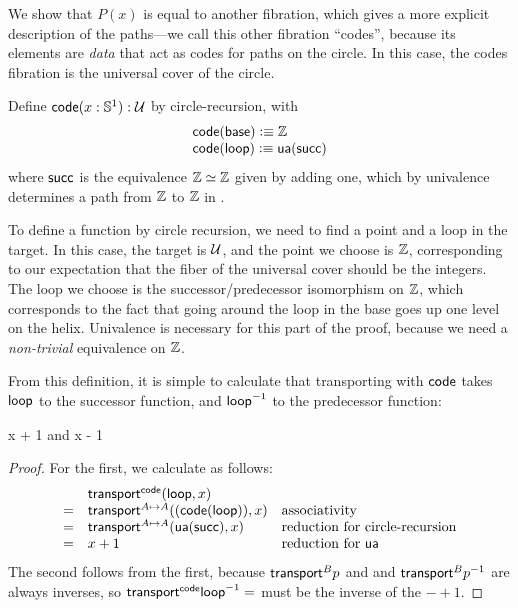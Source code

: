 We show that $P(x)$ is equal to another fibration, which gives a more
explicit description of the paths---we call this other fibration
``codes'', because its elements are \emph{data} that act as codes for
paths on the circle.  In this case, the codes fibration is the universal
cover of the circle.

\begin{defn}
Define $\mathsf{code}(x:\mathbb{S} ^1) : \mathcal{U}$ by circle-recursion, with 
\[
\begin{array}{l}
\mathsf{code}(\mathsf{base}) \vcentcolon\equiv \mathbb{Z} \\
{\mathsf{code}}({\mathsf{loop}}) \vcentcolon\equiv \mathsf{ua}(\mathsf{succ}) \\
\end{array}
\]
where $\mathsf{succ}$ is the equivalence $\mathbb{Z} \simeq \mathbb{Z}$ given by
adding one, which by univalence determines a path from $\mathbb{Z}$ to
$\mathbb{Z}$ in \type.  
\end{defn}

To define a function by circle recursion, we need to find a point and a
loop in the target.  In this case, the target is $\mathcal{U}$, and the point
we choose is $\mathbb{Z}$, corresponding to our expectation that the
fiber of the universal cover should be the integers.  The loop we choose
is the successor/predecessor isomorphism on $\mathbb{Z}$, which
corresponds to the fact that going around the loop in the base goes up
one level on the helix.  Univalence is necessary for this part of the
proof, because we need a \emph{non-trivial} equivalence on $\mathbb{Z}$.  

From this definition, it is simple to calculate that transporting with
$\mathsf{code}$ takes $\mathsf{loop}$ to the successor function, and 
$\mathord{{\mathsf{loop}}^{-1}}$ to the predecessor function:
\begin{lem} \label{lem:transport-s1-code}
 {x + 1} and 
 {x - 1}
\end{lem}
\begin{proof}
For the first, we calculate as follows:
\[
\begin{array}{lll}
 & {\mathsf{transport}^{\mathsf{code}}(\mathsf{loop},x)} &\\
= & \mathsf{transport}^{A \mapsto A}(({\mathsf{code}}({\mathsf{loop}})),x) & \text{associativity}\\
= & \mathsf{transport}^{A \mapsto A}(\mathsf{ua} (\mathsf{succ}),x) & \text{reduction for circle-recursion}\\
= & x + 1 & \text{reduction for \ensuremath{\mathsf{ua}}}
\end{array}
\]
The second follows from the first, because 
$\mathsf{transport}^{B} p$ and 
and ${\mathsf{transport}^{B} {\mathord{{p}^{-1}}}}$ are always inverses, so 
$\id{\transfibf \code {\opp \lloop}}$ must be the inverse of the
$- + 1$.  
\end{proof}


